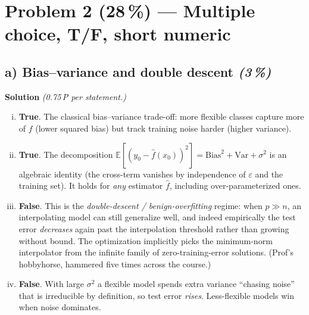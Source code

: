 \documentclass[11pt,a4paper]{article}
\newcommand{\points}[1]{\textbf{(#1\,\%)}}
\newcommand{\subpoints}[1]{\textit{(#1\,\%)}}
\newcommand{\sol}{\noindent\textbf{Solution}}
\begin{document}
\section*{Problem 2 \points{28} --- Multiple choice, T/F, short numeric}

\subsection*{a) Bias--variance and double descent \subpoints{3}}
\sol{} \emph{(0.75\,P per statement.)}
\begin{enumerate}[(i)]
  \item \textbf{True}. The classical bias--variance trade-off: more flexible classes capture more
        of $f$ (lower squared bias) but track training noise harder (higher variance).
  \item \textbf{True}. The decomposition
        $\mathbb{E}[(y_0-\hat f(x_0))^2]=\mathrm{Bias}^2+\mathrm{Var}+\sigma^2$
        is an algebraic identity (the cross-term vanishes by independence of $\varepsilon$ and the
        training set). It holds for \emph{any} estimator $\hat f$, including over-parameterized ones.
  \item \textbf{False}. This is the \emph{double-descent / benign-overfitting} regime: when
        $p \gg n$, an interpolating model can still generalize well, and indeed empirically the
        test error \emph{decreases} again past the interpolation threshold rather than growing
        without bound. The optimization implicitly picks the minimum-norm interpolator from the
        infinite family of zero-training-error solutions. (Prof's hobbyhorse, hammered five times
        across the course.)
  \item \textbf{False}. With large $\sigma^2$ a flexible model spends extra variance ``chasing
        noise'' that is irreducible by definition, so test error \emph{rises}. Less-flexible models
        win when noise dominates.
\end{enumerate}
\end{document}
